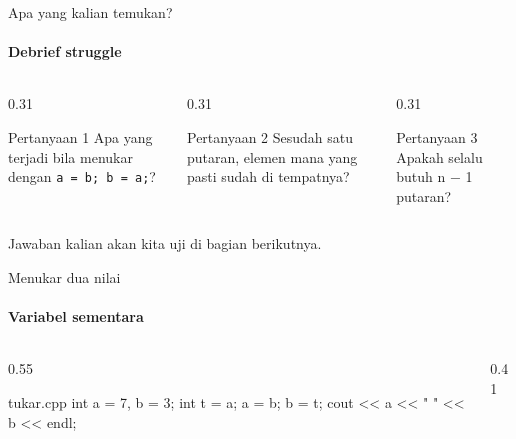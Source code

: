\documentclass[t]{beamer}
\begin{document}
\begin{frame}{Apa yang kalian temukan?}
\framesubtitle{Debrief struggle}
\begin{columns}[T]
\begin{column}{0.31\textwidth}
\begin{BlokGelap}{Pertanyaan 1}
Apa yang terjadi bila menukar dengan \texttt{a = b; b = a;}?
\end{BlokGelap}
\end{column}
\begin{column}{0.31\textwidth}
\begin{BlokGelap}{Pertanyaan 2}
Sesudah satu putaran, elemen mana yang pasti sudah di tempatnya?
\end{BlokGelap}
\end{column}
\begin{column}{0.31\textwidth}
\begin{BlokGelap}{Pertanyaan 3}
Apakah selalu butuh n − 1 putaran?
\end{BlokGelap}
\end{column}
\end{columns}
\vspace{10pt}
Jawaban kalian akan kita uji di bagian berikutnya.
\end{frame}


\begin{frame}[fragile]{Menukar dua nilai}
\framesubtitle{Variabel sementara}
\begin{columns}[T]
\begin{column}{0.55\textwidth}
\begin{Kode}[]{tukar.cpp}
int a = 7, b = 3;
int t = a;
a = b;
b = t;
cout << a << " " << b << endl;
\end{Kode}
\end{column}
\begin{column}{0.41\textwidth}
\end{column}
\end{columns}
\end{frame}
\end{document}
